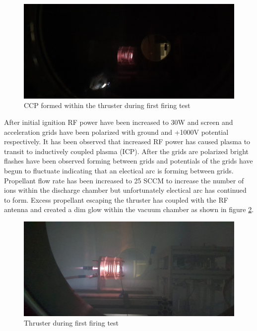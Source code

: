 \begin{figure}[ht]
    \centering
    \includegraphics[width=\linewidth]{fig/deneme1/test1_ccp.jpg}
    \caption{CCP formed within the thruster during first firing test}
    \label{fig:1st_ccp}
\end{figure}

After initial ignition RF power have been increased to 30W and screen and acceleration grids have been polarized with ground and +1000V potential respectively. It has been observed that increased RF power has caused plasma to transit to inductively coupled plasma (ICP). After the grids are polarized bright flashes have been observed forming between grids and potentials of the grids have begun to fluctuate indicating that an electical arc is forming between grids. Propellant flow rate has been increased to 25 SCCM to increase the number of ions within the discharge chamber but unfortunately electical arc has continued to form. Excess propellant escaping the thruster has coupled with the RF antenna and created a dim glow within the vacuum chamber as shown in figure \ref{fig:1st_icp}.
\newpage

\begin{figure}[ht]
    \centering
    \includegraphics[width=\linewidth]{fig/deneme1/test1_discharge.jpg}
    \caption{Thruster during first firing test}
    \label{fig:1st_icp}
\end{figure}

